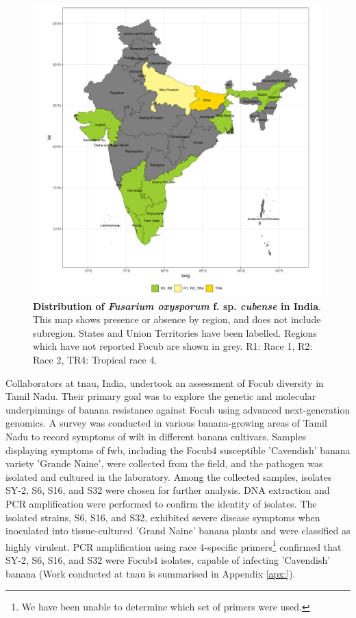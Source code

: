 \bigskip
\begin{figure}[h!]
  \includegraphics[width=15cm]{Figures/FocDis_India.pdf}
  \caption[Distribution of \textit{Fusarium oxysporum} f. sp. \textit{cubense} in India]{\textbf{ Distribution of \textit{Fusarium oxysporum} f. sp. \textit{cubense} in India}. This map shows presence or absence by region, and does not include subregion. States and Union Territories have been labelled. Regions which have not reported \ac{Focub} are shown in grey. R1: Race 1, R2: Race 2, TR4: Tropical race 4.}
  \label{fig:FocDisIndia}
\end{figure}

Collaborators at \ac{tnau}, India, undertook an assessment of \ac{Focub} diversity in Tamil Nadu. Their primary goal was to explore the genetic and molecular underpinnings of banana resistance against \ac{Focub} using advanced next-generation genomics. A survey was conducted in various banana-growing areas of Tamil Nadu to record symptoms of wilt in different banana cultivars. Samples displaying symptoms of \ac{fwb}, including the \ac{Focub4} susceptible 'Cavendish' banana variety 'Grande Naine', were collected from the field, and the pathogen was isolated and cultured in the laboratory. Among the collected samples, isolates SY-2, S6, S16, and S32 were chosen for further analysis. DNA extraction and PCR amplification were performed to confirm the identity of isolates. The isolated strains, S6, S16, and S32, exhibited severe disease symptoms when inoculated into tissue-cultured 'Grand Naine' banana plants and were classified as highly virulent. PCR amplification using race 4-specific primers\footnote{We have been unable to determine which set of primers were used.} confirmed that SY-2, S6, S16, and S32 were \ac{Focub4} isolates, capable of infecting 'Cavendish' banana (Work conducted at \ac{tnau} is summarised in Appendix \ref{apx:}).

